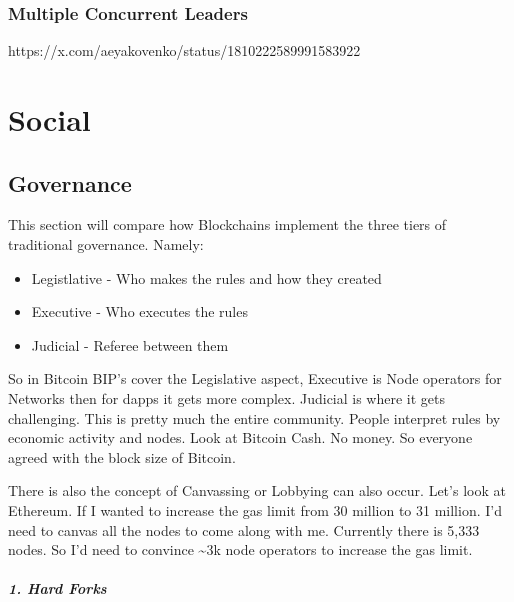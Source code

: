 \documentclass[
  letterpaper,
  DIV=11,
  numbers=noendperiod]{scrreprt}
\providecommand{\tightlist}{%
  \setlength{\itemsep}{0pt}\setlength{\parskip}{0pt}}\usepackage{longtable,booktabs,array}
\begin{document}
\section{Multiple Concurrent Leaders}\label{multiple-concurrent-leaders}

https://x.com/aeyakovenko/status/1810222589991583922

\part{Social}

\chapter{Governance}\label{governance}

This section will compare how Blockchains implement the three tiers of
traditional governance. Namely:

\begin{itemize}
\tightlist
\item
  Legistlative - Who makes the rules and how they created
\item
  Executive - Who executes the rules
\item
  Judicial - Referee between them
\end{itemize}

So in Bitcoin BIP's cover the Legislative aspect, Executive is Node
operators for Networks then for dapps it gets more complex. Judicial is
where it gets challenging. This is pretty much the entire community.
People interpret rules by economic activity and nodes. Look at Bitcoin
Cash. No money. So everyone agreed with the block size of Bitcoin.

There is also the concept of Canvassing or Lobbying can also occur.
Let's look at Ethereum. If I wanted to increase the gas limit from 30
million to 31 million. I'd need to canvas all the nodes to come along
with me. Currently there is 5,333 nodes. So I'd need to convince
\textasciitilde3k node operators to increase the gas limit.

\subsubsection{1. Hard Forks}\label{hard-forks}
\end{document}

